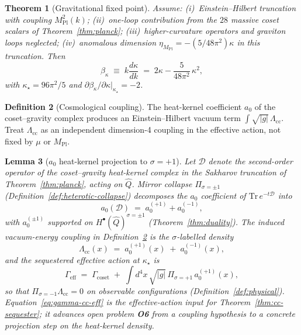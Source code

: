 \documentclass[11pt]{article}
\theoremstyle{plain}
\newtheorem{theorem}{Theorem}[section]
\newtheorem{lemma}[theorem]{Lemma}
\theoremstyle{definition}
\newtheorem{definition}[theorem]{Definition}
\theoremstyle{remark}
\numberwithin{equation}{section}
\newcommand{\MPl}{M_{\mathrm{Pl}}}
\begin{document}
\begin{theorem}[Gravitational fixed point]\label{thm:kappa}
Assume: (i)~Einstein--Hilbert truncation with coupling $\MPl^2(k)$;
(ii)~one-loop contribution from the $28$ massive coset scalars of
Theorem~\ref{thm:planck}; (iii)~higher-curvature operators and graviton loops
neglected; (iv)~anomalous dimension
$\eta_{\MPl}=-(5/48\pi^2)\kappa$ in this truncation. Then
\begin{equation}\label{eq:betakappa}
  \beta_\kappa\;\equiv\;k\frac{d\kappa}{dk}
  \;=\;2\kappa-\frac{5}{48\pi^2}\,\kappa^2,
\end{equation}
with $\kappa_\star=96\pi^2/5$ and
$\partial\beta_\kappa/\partial\kappa|_{\kappa_\star}=-2$.
\end{theorem}

\begin{definition}[Cosmological coupling]\label{def:cc}
The heat-kernel coefficient $a_0$ of the coset--gravity complex produces an
Einstein--Hilbert vacuum term $\int\sqrt{|g|}\,\Lambda_{\mathrm{cc}}$.
Treat $\Lambda_{\mathrm{cc}}$ as an independent dimension-4 coupling in the
effective action, not fixed by $\mu$ or $\MPl$.
\end{definition}

\begin{lemma}[$a_0$ heat-kernel projection to $\sigma=+1$]
\label{lem:a0-sigma-plus}
Let $\mathcal{D}$ denote the second-order operator of the coset--gravity
heat-kernel complex in the Sakharov truncation of Theorem~\ref{thm:planck},
acting on $\hat Q$. Mirror collapse
$\Pi_{\sigma=\pm1}$ (Definition~\ref{def:heterotic-collapse}) decomposes the
$a_0$ coefficient of $\mathrm{Tr}\,e^{-t\mathcal{D}}$ into
\begin{equation}\label{eq:a0-split}
  a_0(\mathcal{D})
  \;=\;
  a_0^{(+1)}+a_0^{(-1)},
\end{equation}
with $a_0^{(\pm1)}$ supported on $H^\bullet(\hat Q)^{\sigma=\pm1}$
(Theorem~\ref{thm:duality}). The induced vacuum-energy coupling in
Definition~\ref{def:cc} is the $\sigma$-labelled density
\begin{equation}\label{eq:a0-density}
  \Lambda_{\mathrm{cc}}(x)
  \;=\;
  a_0^{(+1)}(x)\;+\;a_0^{(-1)}(x),
\end{equation}
and the \emph{sequestered} effective action at $\kappa_\star$ is
\begin{equation}\label{eq:gamma-cc-eff}
  \Gamma_{\mathrm{eff}}
  \;=\;
  \Gamma_{\mathrm{coset}}
  \;+\;
  \int d^4x\,\sqrt{|g|}\,
  \Pi_{\sigma=+1}\,a_0^{(+1)}(x),
\end{equation}
so that $\Pi_{\sigma=-1}\Lambda_{\mathrm{cc}}=0$ on observable configurations
(Definition~\ref{def:physical}). Equation~\eqref{eq:gamma-cc-eff} is the
effective-action input for Theorem~\ref{thm:cc-sequester}; it advances
open problem \textbf{O6} from a coupling hypothesis to a concrete projection
step on the heat-kernel density.
\end{lemma}
\end{document}
